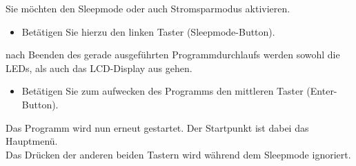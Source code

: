 \label{Sleepmode}

Sie möchten den Sleepmode oder auch Stromsparmodus aktivieren.
\begin{itemize}
	\item Betätigen Sie hierzu den linken Taster (Sleepmode-Button). 
\end{itemize}
nach Beenden des gerade ausgeführten Programmdurchlaufs werden sowohl die \ac{LED}s, als auch das \ac{LCD}-Display aus gehen.
\begin{itemize}
	\item Betätigen Sie zum aufwecken des Programms den mittleren Taster (Enter-Button).
\end{itemize}
Das Programm wird nun erneut gestartet. Der Startpunkt ist dabei das Hauptmenü. \\
Das Drücken der anderen beiden Tastern wird während dem Sleepmode ignoriert.



